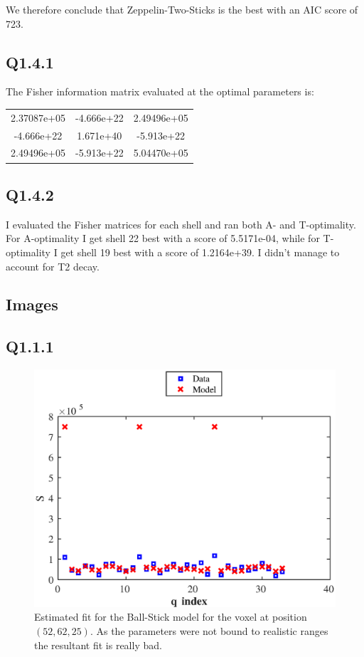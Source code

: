 \documentclass[11pt,a4paper,oneside]{report}
\begin{document}
We therefore conclude that Zeppelin-Two-Sticks is the best with an AIC score of 723.

\subsection*{Q1.4.1}

The Fisher information matrix evaluated at the optimal parameters is:\\
\begin{center}
\begin{tabular}{c c c}
2.37087e+05 & -4.666e+22 & 2.49496e+05\\
-4.666e+22 & 1.671e+40 & -5.913e+22\\
2.49496e+05 & -5.913e+22 & 5.04470e+05\\
\end{tabular}
\end{center}


\subsection*{Q1.4.2}

I evaluated the Fisher matrices for each shell and ran both A- and T-optimality. For A-optimality I get shell 22 best with a score of 5.5171e-04, while for T-optimality I get shell 19 best with a score of 1.2164e+39. I didn't manage to account for T2 decay.

\clearpage

\subsection*{Images}

\subsection*{Q1.1.1}

\begin{figure}[H]
\centering
\includegraphics[scale=0.8]{figures/q1/q111.eps}
\caption{Estimated fit for the Ball-Stick model for the voxel at position $(52,62,25)$. As the parameters were not bound to realistic ranges the resultant fit is really bad.}
\label{q111}
\end{figure}
\end{document}

